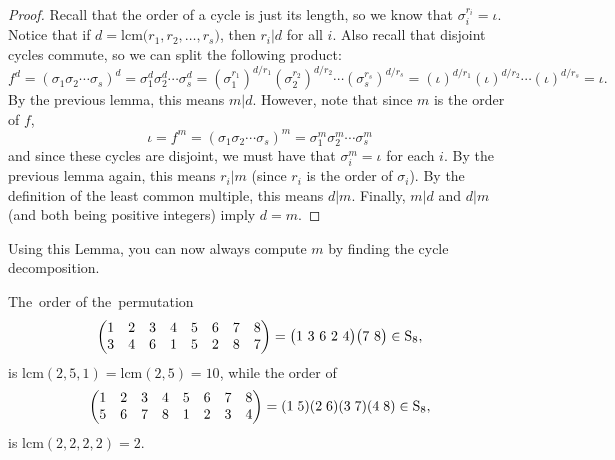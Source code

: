 \documentclass[11pt,dvipsnames]{book}
\numberwithin{equation}{section} %
\numberwithin{figure}{section} %
\numberwithin{table}{section} %
\begin{document}
\begin{proof}
Recall that the order of a cycle is just its length, so we know that $\sigma_i^{r_i}=\iota$. 
Notice that if $d= \mathrm{lcm}\big(r_{1},r_{2},\ldots,r_{s}\big)$, then $r_i|d$ for all $i$. Also recall that disjoint cycles commute, so we can split the following product:
\[
f^{d} = (\sigma_{1}\sigma_{2}\cdots\sigma_{s})^{d}
=\sigma_{1}^{d}\sigma_{2}^{d}\cdots \sigma_{s}^{d} 
=(\sigma_{1}^{r_{1}})^{d/r_{1}}(\sigma_{2}^{r_{2}})^{d/r_{2}}\cdots(\sigma_{s}^{r_{s}})^{d/r_{s}} =
(\iota)^{d/r_{1}}(\iota)^{d/r_{2}}\cdots (\iota)^{d/r_{s}}=\iota. 
\]
By the previous lemma, this means $m|d$. However, note that since $m$ is the order of $f$,
\[
\iota = f^{m} = (\sigma_{1}\sigma_{2}\cdots\sigma_{s})^{m}
=\sigma_{1}^{m}\sigma_{2}^{m}\cdots \sigma_{s}^{m} 
\]
and since these cycles are disjoint, we must have that $\sigma_{i}^{m}=\iota$ for each $i$. By the previous lemma again, this means $r_i|m$ (since $r_i$ is the order of $\sigma_i$). By the definition of the least common multiple, this means $d|m$. Finally, $m|d$ and $d|m$ (and both being positive integers) imply $d=m$.
\end{proof}

Using this Lemma, you can now always compute $m$ by finding the cycle decomposition.

 \begin{example} The~order of the~permutation
$$
\left(\begin{matrix} %
1 & 2 & 3 & 4 & 5 & 6 & 7 & 8\cr%
3 & 4 & 6 & 1 & 5 & 2 & 8 & 7\cr%
\end{matrix}\right) = \big(1\ 3\ 6\ 2\ 4\big)\big(7\ 8\big)\in\mathrm{S}_{8},%
$$
 is $\mathrm{lcm}(2, 5, 1)=\mathrm{lcm}(2, 5)=10$, while the order of 
 $$
\left(\begin{matrix} %
1 & 2 & 3 & 4 & 5 & 6 & 7 & 8\cr%
5 & 6 & 7 & 8 & 1 & 2 & 3 & 4\cr%
\end{matrix}\right) =  (1 \; 5)(2 \; 6)(3\; 7)(4\; 8) \in\mathrm{S}_{8},%
$$
is $\mathrm{lcm}(2,2,2,2)=2$.
 \end{example}


%
%
%
%
%
%
%
%
\end{document}
